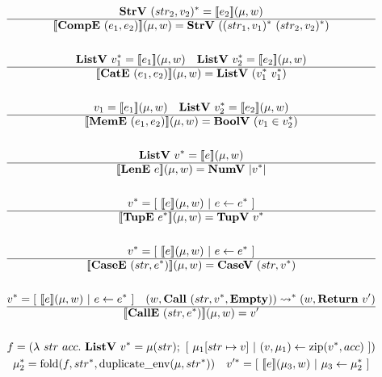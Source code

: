 \begin{gather*}
  \strv ~ \seq{(str_2, v_2)} = \sem{e_2}(\mu, w) \\
  \hline
  \sem{\compe ~ (e_1, e_2)}(\mu, w) = \strv ~ (\seq{(str_1, v_1)} ~ \seq{(str_2, v_2)}) \\
%
\newline \\
  \listv ~ \seq{v_1} = \sem{e_1}(\mu, w) \quad
  \listv ~ \seq{v_2} = \sem{e_2}(\mu, w) \\
  \hline
  \sem{\cate ~ (e_1, e_2)}(\mu, w) = \listv ~ (\seq{v_1} ~ \seq{v_1}) \\
%
\newline \\
  v_1 = \sem{e_1}(\mu, w) \quad
  \listv ~ \seq{v_2} = \sem{e_2}(\mu, w) \\
  \hline
  \sem{\meme ~ (e_1, e_2)}(\mu, w) = \boolv ~ (v_1 \in \seq{v_2}) \\
%
\newline \\
  \listv ~ \seq{v} = \sem{e}(\mu, w) \\
  \hline
  \sem{\lene ~ e}(\mu, w) = \numv ~ |\seq v| \\
%
\newline \\
  \seq{v} = [ ~ \sem{e}(\mu, w) ~ | ~ e \leftarrow \seq e ~ ] \\
  \hline
  \sem{\tupe ~ \seq{e}}(\mu, w) = \tupv ~ \seq{v} \\
%
\newline \\
  \seq{v} = [ ~ \sem{e}(\mu, w) ~ | ~ e \leftarrow \seq e ~ ] \\
  \hline
  \sem{\casee ~ (str, \seq{e})}(\mu, w) = \casev ~ (str, \seq{v}) \\
%
\newline \\
  \seq{v} = [ ~ \sem{e}(\mu, w) ~ | ~ e \leftarrow \seq e ~ ] \quad
  (w, \call ~ (str, \seq v, \mt)) \seq{\leadsto} (w, \ret ~ v') \\
  \hline
  \sem{\calle ~ (str, \seq{e})}(\mu, w) = v' \\
%
\newline \\
  f =
    (\lambda ~ str ~ acc. ~
      \listv ~ \seq v = \mu(str); ~
      [ ~ \mu_1[str \mapsto v] ~ | ~ (v, \mu_1) \leftarrow \zip (\seq v, acc) ~ ]
    )
  \\
  \seq{\mu_2} = \fold(f, \seq{str}, \duplicateenv(\mu, \seq{str})) \quad
  \seq{v'} = [ ~ \sem{e}(\mu_3, w) ~ | ~ \mu_3 \leftarrow \seq {\mu_2} ~ ] \\

\end{gather*}
